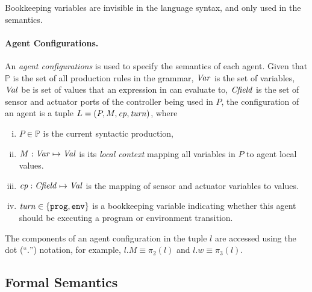 Bookkeeping variables are invisible in the language syntax, and only used in the semantics.


\paragraph{Agent Configurations.}

An \emph{agent configurations} is used to specify the semantics of each agent.
Given that $\mathbb{P}$ is the set of all production rules in the \lgname grammar,
$\mathit{Var}$ is the set of variables, $\mathit{Val}$ be is set of values that an expression in \lgname can evaluate to,
$\mathit{Cfield}$ is the set of sensor and actuator ports of the controller being used in $P$,
the configuration of an agent is a tuple $L = (P, {M},\mathit{cp},\mathit{turn})$, where

\begin{enumerate}[i)]
\item $P \in \mathbb{P}$ is the current syntactic production,
\item ${M} : \mathit{Var} \mapsto \mathit{Val}$ is its \emph{local context} mapping all variables in $P$ to agent local values.
\item $\mathit{cp} : \mathit{Cfield} \mapsto \mathit{Val}$ is the mapping of sensor and actuator variables to values.
\item $\mathit{turn} \in \{\mathtt{prog,env}\}$ is a bookkeeping variable indicating whether this agent should be executing a program or environment transition.
\end{enumerate}

The components of an agent configuration in the tuple $l$ are accessed
using the dot (``$.$'') notation, for example, $l.M\equiv \pi_2(l)$ and $l.w \equiv \pi_3(l)$.


\subsection{Formal Semantics}\label{sec:semantics}



\newcommand{\lsetp}{\{\lconfig{i}^\prime\}}
\newcommand{\lsetpp}{\{\lconfig{i}^{\prime\prime}\}}


